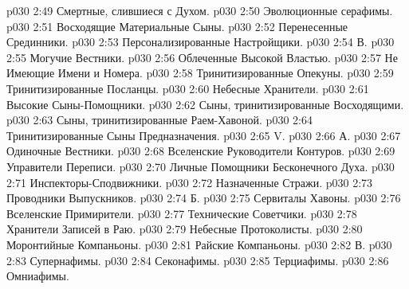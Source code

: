 \vs p030 2:49 \bibnobreakspace Смертные, слившиеся с Духом.
\vs p030 2:50 \bibnobreakspace Эволюционные серафимы.
\vs p030 2:51 \bibnobreakspace Восходящие Материальные Сыны.
\vs p030 2:52 \bibnobreakspace Перенесенные Срединники.
\vs p030 2:53 \bibnobreakspace Персонализированные Настройщики.
\vs p030 2:54 \pc В. 
\vs p030 2:55 \bibnobreakspace Могучие Вестники.
\vs p030 2:56 \bibnobreakspace Облеченные Высокой Властью.
\vs p030 2:57 \bibnobreakspace Не Имеющие Имени и Номера.
\vs p030 2:58 \bibnobreakspace Тринитизированные Опекуны.
\vs p030 2:59 \bibnobreakspace Тринитизированные Посланцы.
\vs p030 2:60 \bibnobreakspace Небесные Хранители.
\vs p030 2:61 \bibnobreakspace Высокие Сыны\hyp{}Помощники.
\vs p030 2:62 \bibnobreakspace Сыны, тринитизированные Восходящими.
\vs p030 2:63 \bibnobreakspace Сыны, тринитизированные Раем\hyp{}Хавоной.
\vs p030 2:64 \bibnobreakspace Тринитизированные Сыны Предназначения.
\vs p030 2:65 \pc V. 
\vs p030 2:66 \pc А. 
\vs p030 2:67 \bibnobreakspace Одиночные Вестники.
\vs p030 2:68 \bibnobreakspace Вселенские Руководители Контуров.
\vs p030 2:69 \bibnobreakspace Управители Переписи.
\vs p030 2:70 \bibnobreakspace Личные Помощники Бесконечного Духа.
\vs p030 2:71 \bibnobreakspace Инспекторы\hyp{}Сподвижники.
\vs p030 2:72 \bibnobreakspace Назначенные Стражи.
\vs p030 2:73 \bibnobreakspace Проводники Выпускников.
\vs p030 2:74 \pc Б. 
\vs p030 2:75 \bibnobreakspace Сервиталы Хавоны.
\vs p030 2:76 \bibnobreakspace Вселенские Примирители.
\vs p030 2:77 \bibnobreakspace Технические Советчики.
\vs p030 2:78 \bibnobreakspace Хранители Записей в Раю.
\vs p030 2:79 \bibnobreakspace Небесные Протоколисты.
\vs p030 2:80 \bibnobreakspace Моронтийные Компаньоны.
\vs p030 2:81 \bibnobreakspace Райские Компаньоны.
\vs p030 2:82 \pc В. 
\vs p030 2:83 \bibnobreakspace Супернафимы.
\vs p030 2:84 \bibnobreakspace Секонафимы.
\vs p030 2:85 \bibnobreakspace Терциафимы.
\vs p030 2:86 \bibnobreakspace Омниафимы.
